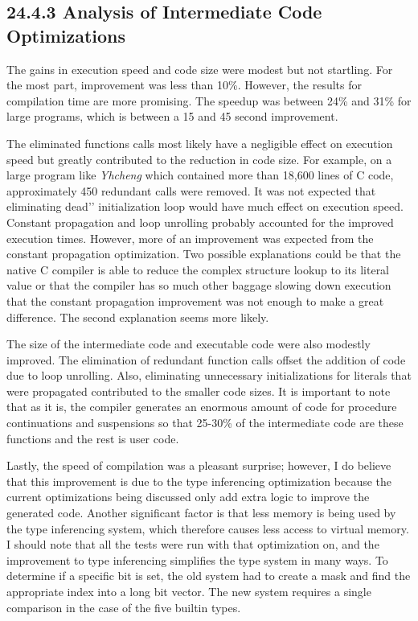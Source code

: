 \subsection[24.4.3 Analysis of Intermediate Code Optimizations]{24.4.3 Analysis of Intermediate Code Optimizations}

The gains in execution speed and code size were modest but not
startling. For the most part, improvement was less than 10\%.
However, the results for compilation time are more promising. The
speedup was between 24\% and 31\% for large programs, which is between
a 15 and 45 second improvement.

The eliminated functions calls most likely have a negligible effect on
execution speed but greatly contributed to the reduction in code
size. For example, on a large program like \textit{Yhcheng} which
contained more than 18,600 lines of C code, approximately 450
redundant calls were removed. It was not expected that eliminating
{\textasciigrave}{\textasciigrave}dead'{}' initialization loop would
have much effect on execution speed. Constant propagation and loop
unrolling probably accounted for the improved execution
times. However, more of an improvement was expected from the constant
propagation optimization. Two possible explanations could be that the
native C compiler is able to reduce the complex structure lookup to
its literal value or that the compiler has so much other baggage
slowing down execution that the constant propagation improvement was
not enough to make a great difference. The second explanation seems
more likely.

The size of the intermediate code and executable code were also
modestly improved. The elimination of redundant function calls offset
the addition of code due to loop unrolling. Also, eliminating
unnecessary initializations for literals that were propagated
contributed to the smaller code sizes. It is important to note that as
it is, the compiler generates an enormous amount of code for procedure
continuations and suspensions so that 25-30\% of the intermediate code
are these functions and the rest is user code.

Lastly, the speed of compilation was a pleasant surprise; however, I
do believe that this improvement is due to the type inferencing
optimization because the current optimizations being discussed only
add extra logic to improve the generated code. Another significant
factor is that less memory is being used by the type inferencing
system, which therefore causes less access to virtual memory. I should
note that all the tests were run with that optimization on, and the
improvement to type inferencing simplifies the type system in many
ways. To determine if a specific bit is set, the old system had to
create a mask and find the appropriate index into a long bit
vector. The new system requires a single comparison in the case of the
five builtin types.

